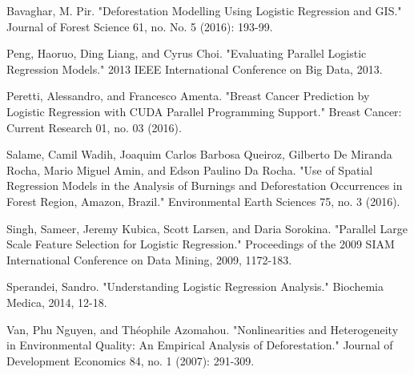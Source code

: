 \documentclass[letterpaper, 10 pt, conference]{ieeeconf}  %
\begin{document}
\begin{thebibliography}{99}


 Bavaghar, M. Pir. "Deforestation Modelling Using Logistic Regression and GIS." Journal of Forest Science 61, no. No. 5 (2016): 193-99. 

 Peng, Haoruo, Ding Liang, and Cyrus Choi. "Evaluating Parallel Logistic Regression Models." 2013 IEEE International Conference on Big Data, 2013. 

 Peretti, Alessandro, and Francesco Amenta. "Breast Cancer Prediction by Logistic Regression with CUDA Parallel Programming Support." Breast Cancer: Current Research 01, no. 03 (2016).

 Salame, Camil Wadih, Joaquim Carlos Barbosa Queiroz, Gilberto De Miranda Rocha, Mario Miguel Amin, and Edson Paulino Da Rocha. "Use of Spatial Regression Models in the Analysis of Burnings and Deforestation Occurrences in Forest Region, Amazon, Brazil." Environmental Earth Sciences 75, no. 3 (2016). 

 Singh, Sameer, Jeremy Kubica, Scott Larsen, and Daria Sorokina. "Parallel Large Scale Feature Selection for Logistic Regression." Proceedings of the 2009 SIAM International Conference on Data Mining, 2009, 1172-183. 

 Sperandei, Sandro. "Understanding Logistic Regression Analysis." Biochemia Medica, 2014, 12-18.

 Van, Phu Nguyen, and Théophile Azomahou. "Nonlinearities and Heterogeneity in Environmental Quality: An Empirical Analysis of Deforestation." Journal of Development Economics 84, no. 1 (2007): 291-309. 








\end{thebibliography}
\end{document}
